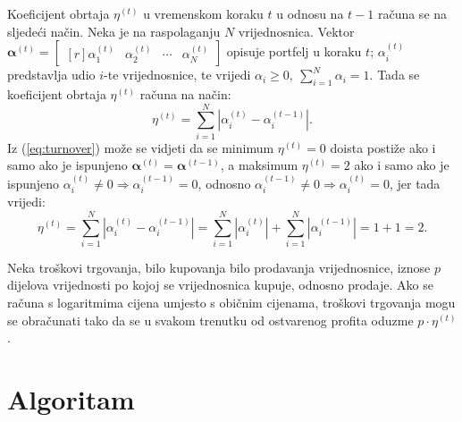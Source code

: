 \documentclass[lmodern, utf8, diplomski, numeric]{fer}
\newcommand{\matr}[1]{\mathbold{#1}}
\newcommand{\q}{\left}
\newcommand{\w}{\right}
\begin{document}
  Koeficijent obrtaja $\eta^{(t)}$ u vremenskom koraku $t$ u odnosu na $t-1$ računa se na sljedeći način.
  Neka je na raspolaganju $N$ vrijednosnica.
  Vektor $\matr{\alpha}^{(t)} = \begin{bmatrix*}[r] \alpha_1^{(t)} & \alpha_2^{(t)} & \cdots & \alpha_N^{(t)} \end{bmatrix*}$ opisuje portfelj u koraku $t$; $\alpha_i^{(t)}$ predstavlja udio $i$-te vrijednosnice, te vrijedi $\alpha_i \ge 0,\ \sum_{i=1}^{N} \alpha_i = 1$.
  Tada se koeficijent obrtaja $\eta^{(t)}$ računa na način:
  \begin{equation}
  \label{eq:turnover}
  \eta^{(t)} = \sum_{i=1}^{N} \q \lvert \alpha_i^{(t)} - \alpha_i^{(t-1)} \w \rvert.
  \end{equation}
  Iz (\ref{eq:turnover}) može se vidjeti da se minimum $\eta^{(t)} = 0$ doista postiže ako i samo ako je ispunjeno $\matr{\alpha}^{(t)} = \matr{\alpha}^{(t-1)}$,
  a maksimum $\eta^{(t)} = 2$ ako i samo ako je ispunjeno $\alpha_i^{(t)} \ne 0 \Rightarrow \alpha_i^{(t - 1)} = 0$, odnosno $\alpha_i^{(t - 1)} \ne 0 \Rightarrow \alpha_i^{(t)} = 0$, jer tada vrijedi: 
  \begin{equation*}
  \eta^{(t)} = \sum_{i=1}^{N} \q \lvert \alpha_i^{(t)} - \alpha_i^{(t-1)} \w \rvert = \sum_{i=1}^{N} \q \lvert \alpha_i^{(t)}\w \rvert + \sum_{i=1}^N \q \lvert\alpha_i^{(t-1)} \w \rvert = 1 + 1 = 2.
  \end{equation*}
  
  Neka troškovi trgovanja, bilo kupovanja bilo prodavanja vrijednosnice, iznose $p$ dijelova vrijednosti po kojoj se vrijednosnica kupuje, odnosno prodaje.
  Ako se računa s logaritmima cijena umjesto s običnim cijenama, troškovi trgovanja mogu se obračunati tako da se u svakom trenutku od ostvarenog profita oduzme $p \cdot \eta^{(t)}$.
  
%  
  
\chapter{Algoritam}
\end{document}
